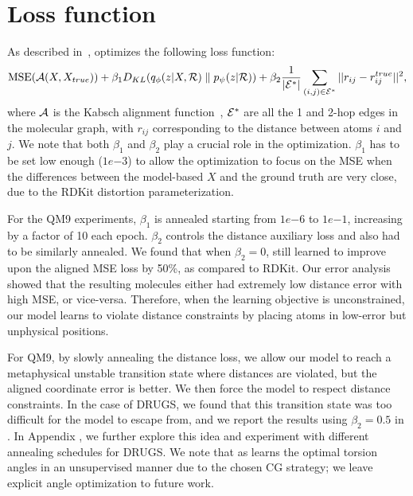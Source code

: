 \section{Loss function}
\label{section:appendix-loss-func}
\vspace{-1ex}
As described in~, \model optimizes the following loss function:
\begin{equation}
\begin{aligned}
    \text{MSE}({\mathcal{A}}(X,X_{true})) + \beta_1 D_{KL}(q_\phi(z | X, {\mathcal{R}})\parallel p_\psi(z|{\mathcal{R}})) + \beta_2 \frac{1}{|{\mathcal{E}}^*|}\sum_{(i,j) \in{\mathcal{E}}^*}||r_{ij} - r^{true}_{ij}||^2,
\label{eq:loss}
\end{aligned}
\end{equation}
where ${\mathcal{A}}$ is the Kabsch alignment function~\citep{Kabsch}, ${\mathcal{E}}^*$ are all the 1 and 2-hop edges in the molecular graph, with $r_{ij}$ corresponding to the distance between atoms $i$ and $j$. We note that both $\beta_1$ and $\beta_2$ play a crucial role in the optimization. $\beta_1$ has to be set low enough ($1e{-3}$) to allow the optimization to focus on the MSE when the differences between the model-based $X$ and the ground truth are very close, due to the RDKit distortion parameterization. 

For the QM9 experiments, $\beta_1$ is annealed starting from $1e{-6}$ to $1e{-1}$, increasing by a factor of 10 each epoch. $\beta_2$ controls the distance auxiliary loss and also had to be similarly annealed. We found that when $\beta_2 = 0$, \model still learned to improve upon the aligned MSE loss by 50\%, as compared to RDKit. Our error analysis showed that the resulting molecules either had extremely low distance error with high MSE, or vice-versa. Therefore, when the learning objective is unconstrained, our model learns to violate distance constraints by placing atoms in low-error but unphysical positions.

For QM9, by slowly annealing the distance loss, we allow our model to reach a metaphysical unstable transition state where distances are violated, but the aligned coordinate error is better. We then force the model to respect distance constraints. In the case of DRUGS, we found that this transition state was too difficult for the model to escape from, and we report the results using $\beta_2 = 0.5$ in . In Appendix , we further explore this idea and experiment with different annealing schedules for DRUGS. 
We note that as \model learns the optimal torsion angles in an unsupervised manner due to the chosen CG strategy; we leave explicit angle optimization to future work.

